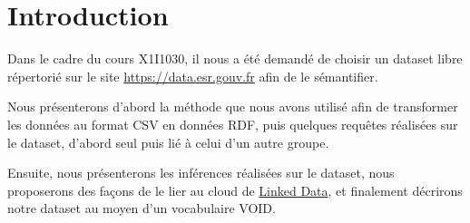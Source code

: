 \chapter*{Introduction}

Dans le cadre du cours X1I1030, il nous a été demandé de choisir un dataset libre répertorié sur le site \url{https://data.esr.gouv.fr} afin de le sémantifier.

Nous présenterons d'abord la méthode que nous avons utilisé afin de transformer les données au format CSV en données RDF, puis quelques requêtes réalisées sur le dataset, d'abord seul puis lié à celui d'un autre groupe.

Ensuite, nous présenterons les inférences réalisées sur le dataset, nous proposerons des façons de le lier au cloud de \href{http://linkeddata.org}{Linked Data}, et finalement décrirons notre dataset au moyen d'un vocabulaire VOID.